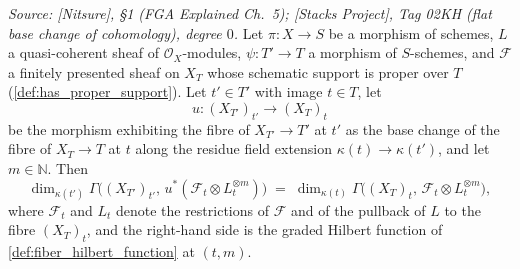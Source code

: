 \begin{lemma}\leanok
  \label{lem:gamma_fiber_baseChange_field}
  \textit{Source: [Nitsure], \S 1 (FGA Explained Ch.~5); [Stacks Project],
  Tag 02KH (flat base change of cohomology), degree \(0\).}
  Let \(\pi : X \to S\) be a morphism of schemes, \(L\) a quasi-coherent
  sheaf of \(\mathcal{O}_X\)-modules, \(\psi : T' \to T\) a morphism of
  \(S\)-schemes, and \(\mathcal{F}\) a finitely presented sheaf on \(X_T\)
  whose schematic support is proper over \(T\)
  (\cref{def:has_proper_support}).  Let \(t' \in T'\) with image
  \(t \in T\), let
  \[
    u : (X_{T'})_{t'} \longrightarrow (X_T)_t
  \]
  be the morphism exhibiting the fibre of \(X_{T'} \to T'\) at \(t'\) as the
  base change of the fibre of \(X_T \to T\) at \(t\) along the residue field
  extension \(\kappa(t) \to \kappa(t')\), and let \(m \in \mathbb{N}\).
  Then
  \[
    \dim_{\kappa(t')} \Gamma\bigl((X_{T'})_{t'},\,
      u^*(\mathcal{F}_t \otimes L_t^{\otimes m})\bigr)
    \;=\;
    \dim_{\kappa(t)} \Gamma\bigl((X_T)_t,\,
      \mathcal{F}_t \otimes L_t^{\otimes m}\bigr),
  \]
  where \(\mathcal{F}_t\) and \(L_t\) denote the restrictions of
  \(\mathcal{F}\) and of the pullback of \(L\) to the fibre \((X_T)_t\), and
  the right-hand side is the graded Hilbert function of
  \cref{def:fiber_hilbert_function} at \((t, m)\).
\end{lemma}
